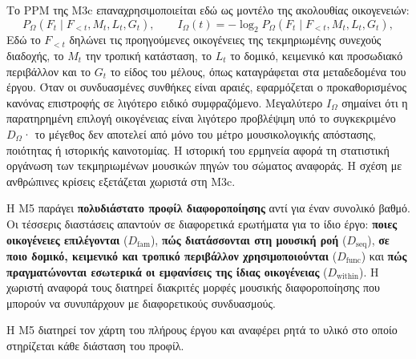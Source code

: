 \documentclass[11pt,a4paper]{article}
\begin{document}
Το PPM της M3c επαναχρησιμοποιείται εδώ ως μοντέλο της ακολουθίας οικογενειών:
\[
P_{\Omega}(F_t\mid F_{<t},M_t,L_t,G_t),
\qquad
I_{\Omega}(t)=-\log_2 P_{\Omega}(F_t\mid F_{<t},M_t,L_t,G_t),
\]
Εδώ το $F_{<t}$ δηλώνει τις προηγούμενες οικογένειες της τεκμηριωμένης συνεχούς διαδοχής, το $M_t$ την τροπική κατάσταση, το $L_t$ το δομικό, κειμενικό και προσωδιακό περιβάλλον και το $G_t$ το είδος του μέλους, όπως καταγράφεται στα μεταδεδομένα του έργου. Όταν οι συνδυασμένες συνθήκες είναι αραιές, εφαρμόζεται ο προκαθορισμένος κανόνας επιστροφής σε λιγότερο ειδικό συμφραζόμενο. Μεγαλύτερο $I_{\Omega}$ σημαίνει ότι η παρατηρημένη επιλογή οικογένειας είναι λιγότερο προβλέψιμη υπό το συγκεκριμένο $D_{\Omega}$· το μέγεθος δεν αποτελεί από μόνο του μέτρο μουσικολογικής απόστασης, ποιότητας ή ιστορικής καινοτομίας. Η ιστορική του ερμηνεία αφορά τη στατιστική οργάνωση των τεκμηριωμένων μουσικών πηγών του σώματος αναφοράς. Η σχέση με ανθρώπινες κρίσεις εξετάζεται χωριστά στη M3c.

Η M5 παράγει \textbf{πολυδιάστατο προφίλ διαφοροποίησης} αντί για έναν συνολικό βαθμό. Οι τέσσερις διαστάσεις απαντούν σε διαφορετικά ερωτήματα για το ίδιο έργο: \textbf{ποιες οικογένειες επιλέγονται} ($D_{\mathrm{fam}}$), \textbf{πώς διατάσσονται στη μουσική ροή} ($D_{\mathrm{seq}}$), \textbf{σε ποιο δομικό, κειμενικό και τροπικό περιβάλλον χρησιμοποιούνται} ($D_{\mathrm{func}}$) και \textbf{πώς πραγματώνονται εσωτερικά οι εμφανίσεις της ίδιας οικογένειας} ($D_{\mathrm{within}}$). Η χωριστή αναφορά τους διατηρεί διακριτές μορφές μουσικής διαφοροποίησης που μπορούν να συνυπάρχουν με διαφορετικούς συνδυασμούς.

Η M5 διατηρεί τον χάρτη του πλήρους έργου και αναφέρει ρητά το υλικό στο οποίο στηρίζεται κάθε διάσταση του προφίλ.
\end{document}
